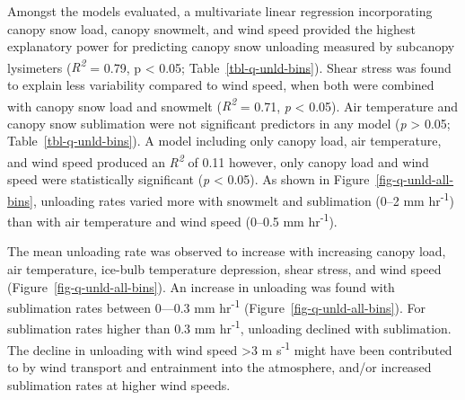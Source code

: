 \documentclass[
]{agujournal2019}
\begin{document}
Amongst the models evaluated, a multivariate linear regression
incorporating canopy snow load, canopy snowmelt, and wind speed provided
the highest explanatory power for predicting canopy snow unloading
measured by subcanopy lysimeters (\emph{R\textsuperscript{2}} = 0.79, p
\textless{} 0.05; Table~\ref{tbl-q-unld-bins}). Shear stress was found
to explain less variability compared to wind speed, when both were
combined with canopy snow load and snowmelt (\emph{R\textsuperscript{2}}
= 0.71, \emph{p} \textless{} 0.05). Air temperature and canopy snow
sublimation were not significant predictors in any model (\emph{p}
\textgreater{} 0.05; Table~\ref{tbl-q-unld-bins}). A model including
only canopy load, air temperature, and wind speed produced an
\emph{R\textsuperscript{2}} of 0.11 however, only canopy load and wind
speed were statistically significant (\emph{p} \textless{} 0.05). As
shown in Figure~\ref{fig-q-unld-all-bins}, unloading rates varied more
with snowmelt and sublimation (0--2 mm hr\textsuperscript{-1}) than with
air temperature and wind speed (0--0.5 mm hr\textsuperscript{-1}).

The mean unloading rate was observed to increase with increasing canopy
load, air temperature, ice-bulb temperature depression, shear stress,
and wind speed (Figure~\ref{fig-q-unld-all-bins}). An increase in
unloading was found with sublimation rates between 0---0.3 mm
hr\textsuperscript{-1} (Figure~\ref{fig-q-unld-all-bins}). For
sublimation rates higher than 0.3 mm hr\textsuperscript{-1}, unloading
declined with sublimation. The decline in unloading with wind speed
\textgreater3 m s\textsuperscript{-1} might have been contributed to by
wind transport and entrainment into the atmosphere, and/or increased
sublimation rates at higher wind speeds.
\end{document}
